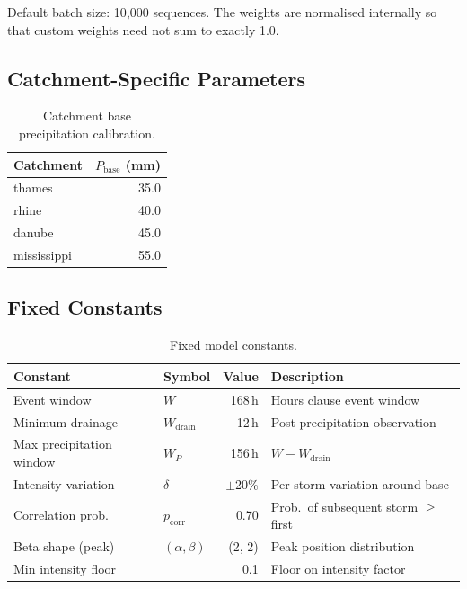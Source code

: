 \documentclass[11pt,a4paper]{article}
\begin{document}
\noindent Default batch size: 10{,}000 sequences. The weights are normalised internally
so that custom weights need not sum to exactly 1.0.

\subsection{Catchment-Specific Parameters}

\begin{table}[H]
  \centering
  \caption{Catchment base precipitation calibration.}
  \label{tab:catchment_precip}
  \begin{tabular}{lr}
    \toprule
    \textbf{Catchment} & $P_{\text{base}}$ (mm) \\
    \midrule
    thames      & 35.0 \\
    rhine       & 40.0 \\
    danube      & 45.0 \\
    mississippi & 55.0 \\
    \bottomrule
  \end{tabular}
\end{table}

\subsection{Fixed Constants}

\begin{table}[H]
  \centering
  \caption{Fixed model constants.}
  \label{tab:constants}
  \begin{tabular}{llrl}
    \toprule
    \textbf{Constant} & \textbf{Symbol} & \textbf{Value} & \textbf{Description} \\
    \midrule
    Event window        & $W$             & 168\,h   & Hours clause event window \\
    Minimum drainage    & $W_{\text{drain}}$ & 12\,h & Post-precipitation observation \\
    Max precipitation window & $W_P$      & 156\,h   & $W - W_{\text{drain}}$ \\
    Intensity variation & $\delta$        & $\pm$20\% & Per-storm variation around base \\
    Correlation prob.   & $p_{\text{corr}}$ & 0.70  & Prob.\ of subsequent storm $\geq$ first \\
    Beta shape (peak)   & $(\alpha, \beta)$ & (2, 2) & Peak position distribution \\
    Min intensity floor &                 & 0.1      & Floor on intensity factor \\
    \bottomrule
  \end{tabular}
\end{table}
\end{document}
